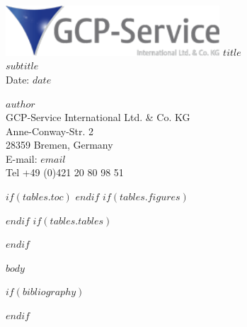 \documentclass[oneside, 12pt, a4paper]{article}
\begin{document}
\begin{titlepage}
   \begin{center}
    \includegraphics[width=0.6\textwidth]{gpc-service-logo.png}
       \vspace*{1cm}
        \vfill
        \huge
        \textbf{$title$} \\
        \large
        \vspace{0.5cm}
        $subtitle$\\
        \vspace{0.5cm}
        Date: $date$\\
        \vspace{1.5cm}
        \vfill
        \vspace{0.8cm}

\begin{flushleft}
$author$\\
GCP-Service International Ltd. \& Co. KG \\
Anne-Conway-Str. 2 \\
28359 Bremen, Germany \\
E-mail: $email$\\
Tel +49 (0)421 20 80 98 51
\end{flushleft}
\end{center}

\end{titlepage}

$if(tables.toc)$
\tableofcontents
\newpage
$endif$
$if(tables.figures)$
\listoffigures
\newpage
$endif$
$if(tables.tables)$
\listoftables
\newpage
$endif$

$body$

$if(bibliography)$
\newpage
{}

$endif$
\end{document}
